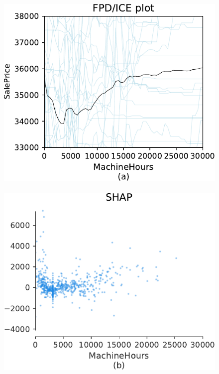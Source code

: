 \documentclass[]{article} %
\begin{document}
\begin{figure}[!htbp]
\begin{center}
\includegraphics[scale=0.35]{images/bulldozer_MachineHours_pdp.pdf}~~
\includegraphics[scale=0.35]{images/bulldozer_MachineHours_shap.pdf}~~

\end{center}
\end{figure}
\end{document}
